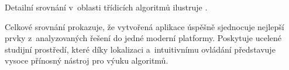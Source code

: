 Detailní srovnání v~oblasti třídicích algoritmů ilustruje .

\begin{table}[H]
    \centering
    \caption{Srovnání výsledné aplikace s~existujícími nástroji pro třídicí algoritmy}
    \label{tab:final_comparison_sa}
\end{table}

Celkové srovnání prokazuje, že vytvořená aplikace úspěšně sjednocuje nejlepší prvky z~analyzovaných řešení do jedné moderní platformy.
Poskytuje ucelené studijní prostředí, které díky lokalizaci a~intuitivnímu ovládání představuje vysoce přínosný nástroj pro výuku algoritmů.
